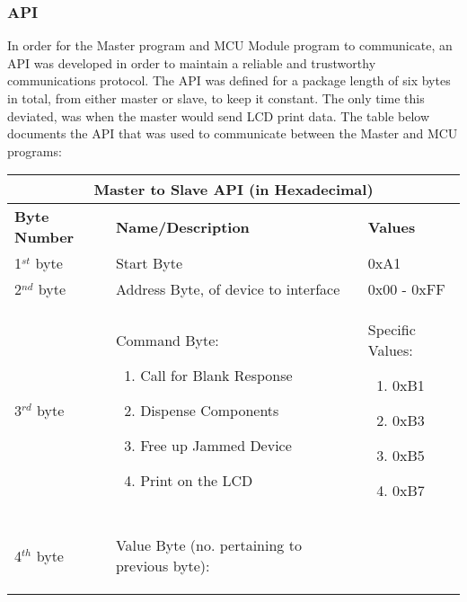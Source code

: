 \documentclass[a4paper,11pt]{article}
\numberwithin{figure}{section}
\numberwithin{table}{section}
\begin{document}
\subsubsection{API}
\label{subsubsec:API}
In order for the Master program and MCU Module program to communicate, an API was developed in order to maintain a reliable and trustworthy communications protocol. The API was defined for a package length of six bytes in total, from either master or slave, to keep it constant. The only time this deviated, was when the master would send LCD print data. The table below documents the API that was used to communicate between the Master and MCU programs:
	\begin{center}
		\begin{table}[ht]
			\centering
			\begin{tabular}{| m{3cm} | m{5cm}| m{5cm} |}
			\hline
			\multicolumn{3}{|c|}{\bfseries Master to Slave API (in Hexadecimal)}\\
			\hline
			\bfseries{Byte Number}  & \bfseries{Name/Description} & \bfseries{Values} \\
			\hline
			1$^{st}$ byte & Start Byte & 0xA1\\
			\hline
			2$^{nd}$ byte & Address Byte, of device to interface & 0x00 - 0xFF \\
			\hline
			3$^{rd}$ byte & Command Byte: {\begin{enumerate}[noitemsep,topsep=0pt,parsep=0pt]			  
											\item Call for Blank Response
											\item Dispense Components
											\item Free up Jammed Device
											\item Print on the LCD
										\end{enumerate}}	& Specific Values: \begin{enumerate}[noitemsep,topsep=0pt,parsep=0pt] 
																			\item 0xB1
																			\item 0xB3
																			\item 0xB5
																			\item 0xB7
																			\end{enumerate} \\
			\hline
			4$^{th}$ byte & Value Byte (no. pertaining to previous byte): \begin{enumerate}[nosep]
																				\setlength{\itemsep}{0pt}
   																				\setlength{\parskip}{0pt}

\end{enumerate}
\end{tabular}
\end{table}
\end{center}
\end{document}
